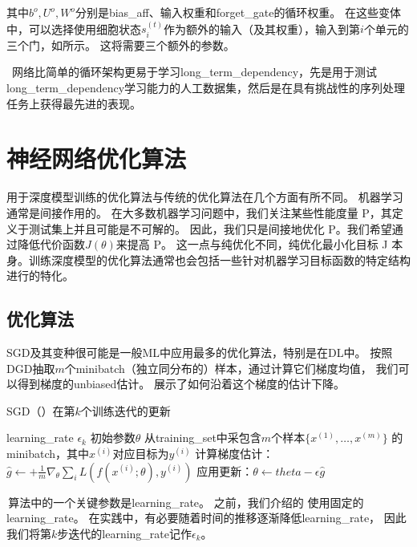 其中$b^o, U^o, W^o$分别是\gls{bias_aff}、输入权重和\gls{forget_gate}的循环权重。
在这些变体中，可以选择使用细胞状态$s_i^{(t)}$作为额外的输入（及其权重），输入到第$i$个单元的三个门，如所示。
这将需要三个额外的参数。

~网络比简单的循环架构更易于学习\gls{long_term_dependency}，先是用于测试\gls{long_term_dependency}学习能力的人工数据集\citep{Bengio-trnn94,Hochreiter+Schmidhuber-1997,chapter-gradient-flow-2001}，然后是在具有挑战性的序列处理任务上获得最先进的表现\citep{Graves-book2012,Graves-arxiv2013,Sutskever-et-al-NIPS2014}。

\section{神经网络优化算法}
用于深度模型训练的优化算法与传统的优化算法在几个方面有所不同。 机器学习通常是间接作用的。
在大多数机器学习问题中，我们关注某些性能度量 P，其定义于测试集上并且可能是不可解的。
因此，我们只是间接地优化 P。我们希望通过降低代价函数$J(θ)$来提高 P。
这一点与纯优化不同，纯优化最小化目标 J 本身。训练深度模型的优化算法通常也会包括一些针对机器学习目标函数的特定结构进行的特化。

\subsection{优化算法}
\label{sec:stochastic_gradient_descent_chap8}
\gls{SGD}及其变种很可能是一般\gls{ML}中应用最多的优化算法，特别是在\gls{DL}中。
按照\gls{DGD}抽取$m$个\gls{minibatch}（独立同分布的）样本，通过计算它们梯度均值，
我们可以得到梯度的\gls{unbiased}估计。
展示了如何沿着这个梯度的估计下降。

\begin{algorithm}[ht]
	\caption{\gls{SGD}（）在第$k$个训练迭代的更新}
	\label{alg:sgd}
	\begin{algorithmic}
		\REQUIRE \gls{learning_rate} $\epsilon_k$
		\REQUIRE 初始参数$\theta$
		\STATE 从\gls{training_set}中采包含$m$个样本$\{ x^{(1)},\dots, x^{(m)}\}$ 的\gls{minibatch}，其中$x^{(i)}$对应目标为$y^{(i)}$
		\STATE 计算梯度估计： $\hat{g} \leftarrow + 
		\frac{1}{m} \nabla_{\theta} \sum_i L(f(x^{(i)};\theta),y^{(i)})$
		\STATE 应用更新：$\theta \leftarrow theta - \epsilon \hat{g}$
		\ENDWHILE
	\end{algorithmic}
\end{algorithm}

\,算法中的一个关键参数是\gls{learning_rate}。
之前，我们介绍的\,\,使用固定的\gls{learning_rate}。
在实践中，有必要随着时间的推移逐渐降低\gls{learning_rate}，
因此我们将第$k$步迭代的\gls{learning_rate}记作$\epsilon_k$。

